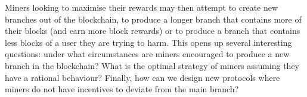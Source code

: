 \documentclass[a4paper,english,cleveref, autoref,numberwithinsect]{lipics-v2019}
\begin{document}
%
Miners looking to maximise their rewards may then attempt to create new branches out of the blockchain, to produce a longer branch that contains more of their blocks (and earn more block rewards) or to produce a branch that contains less blocks of a user they are trying to harm. This opens up several interesting questions: under what circumstances are miners 
encouraged to produce a new branch in the blockchain? What is the optimal strategy of miners assuming they have a rational behaviour? %
Finally, how can we design new protocols where miners do not have incentives to deviate from the main branch? 


\end{document}
